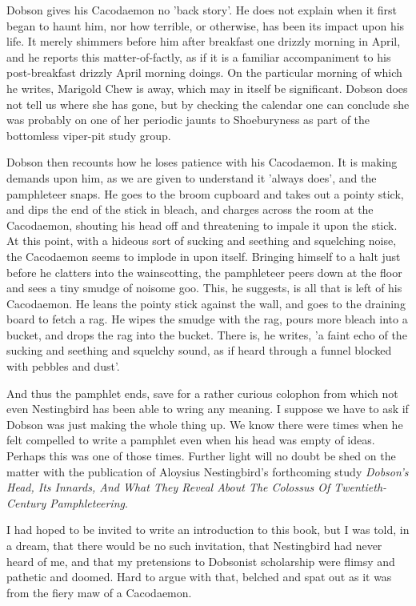 Dobson gives his Cacodaemon no 'back story'. He does not explain when it first began to haunt him, nor how terrible, or otherwise, has been its impact upon his life. It merely shimmers before him after breakfast one drizzly morning in April, and he reports this matter-of-factly, as if it is a familiar accompaniment to his post-breakfast drizzly April morning doings. On the particular morning of which he writes, Marigold Chew is away, which may in itself be significant. Dobson does not tell us where she has gone, but by checking the calendar one can conclude she was probably on one of her periodic jaunts to Shoeburyness as part of the bottomless viper-pit study group.

Dobson then recounts how he loses patience with his Cacodaemon. It is making demands upon him, as we are given to understand it 'always does', and the pamphleteer snaps. He goes to the broom cupboard and takes out a pointy stick, and dips the end of the stick in bleach, and charges across the room at the Cacodaemon, shouting his head off and threatening to impale it upon the stick. At this point, with a hideous sort of sucking and seething and squelching noise, the Cacodaemon seems to implode in upon itself. Bringing himself to a halt just before he clatters into the wainscotting, the pamphleteer peers down at the floor and sees a tiny smudge of noisome goo. This, he suggests, is all that is left of his Cacodaemon. He leans the pointy stick against the wall, and goes to the draining board to fetch a rag. He wipes the smudge with the rag, pours more bleach into a bucket, and drops the rag into the bucket. There is, he writes, 'a faint echo of the sucking and seething and squelchy sound, as if heard through a funnel blocked with pebbles and dust'.

And thus the pamphlet ends, save for a rather curious colophon from which not even Nestingbird has been able to wring any meaning. I suppose we have to ask if Dobson was just making the whole thing up. We know there were times when he felt compelled to write a pamphlet even when his head was empty of ideas. Perhaps this was one of those times. Further light will no doubt be shed on the matter with the publication of Aloysius Nestingbird's forthcoming study \emph{Dobson's Head, Its Innards, And What They Reveal About The Colossus Of Twentieth-Century Pamphleteering}.

I had hoped to be invited to write an introduction to this book, but I was told, in a dream, that there would be no such invitation, that Nestingbird had never heard of me, and that my pretensions to Dobsonist scholarship were flimsy and pathetic and doomed. Hard to argue with that, belched and spat out as it was from the fiery maw of a Cacodaemon.